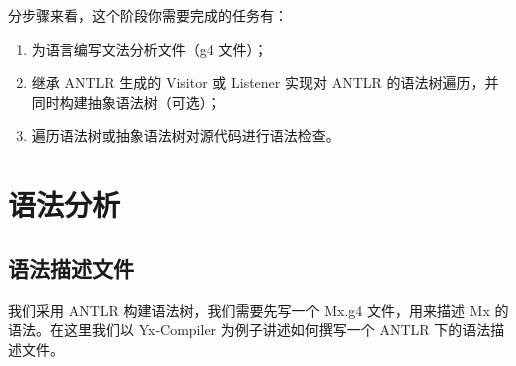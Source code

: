 分步骤来看，这个阶段你需要完成的任务有：
\begin{enumerate}
    \item 为语言编写文法分析文件（g4 文件）；
    \item 继承 ANTLR 生成的 Visitor 或 Listener 实现对 ANTLR 的语法树遍历，并同时构建抽象语法树（可选）；
    \item 遍历语法树或抽象语法树对源代码进行语法检查。
\end{enumerate}





\section{语法分析}
\subsection{语法描述文件}
我们采用 ANTLR 构建语法树，我们需要先写一个 Mx.g4 文件，用来描述 Mx 的语法。在这里我们以 Yx-Compiler\cite{Yx}
为例子讲述如何撰写一个 ANTLR 下的语法描述文件。

